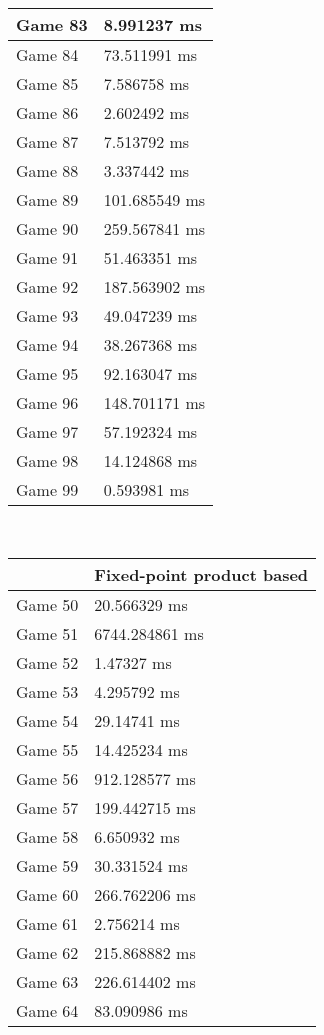 \begin{multicols}{2}
\begin{tabular}{|l|l|}
	Game 83 & 8.991237 ms \\ \hline
	Game 84 & 73.511991 ms \\ \hline
	Game 85 & 7.586758 ms \\ \hline
	Game 86 & 2.602492 ms \\ \hline
	Game 87 & 7.513792 ms \\ \hline
	Game 88 & 3.337442 ms \\ \hline
	Game 89 & 101.685549 ms \\ \hline
	Game 90 & 259.567841 ms \\ \hline
	Game 91 & 51.463351 ms \\ \hline
	Game 92 & 187.563902 ms \\ \hline
	Game 93 & 49.047239 ms \\ \hline
	Game 94 & 38.267368 ms \\ \hline
	Game 95 & 92.163047 ms \\ \hline
	Game 96 & 148.701171 ms \\ \hline
	Game 97 & 57.192324 ms \\ \hline
	Game 98 & 14.124868 ms \\ \hline
	Game 99 & 0.593981 ms \\ \hline
\end{tabular}\\
\begin{tabular}{|l|l|}
	\hline
	& Fixed-point product based \\ \hline
	Game 50 & 20.566329 ms \\ \hline
	Game 51 & 6744.284861 ms \\ \hline
	Game 52 & 1.47327 ms \\ \hline
	Game 53 & 4.295792 ms \\ \hline
	Game 54 & 29.14741 ms \\ \hline
	Game 55 & 14.425234 ms \\ \hline
	Game 56 & 912.128577 ms \\ \hline
	Game 57 & 199.442715 ms \\ \hline
	Game 58 & 6.650932 ms \\ \hline
	Game 59 & 30.331524 ms \\ \hline
	Game 60 & 266.762206 ms \\ \hline
	Game 61 & 2.756214 ms \\ \hline
	Game 62 & 215.868882 ms \\ \hline
	Game 63 & 226.614402 ms \\ \hline
	Game 64 & 83.090986 ms \\ \hline

\end{tabular}
\end{multicols}
